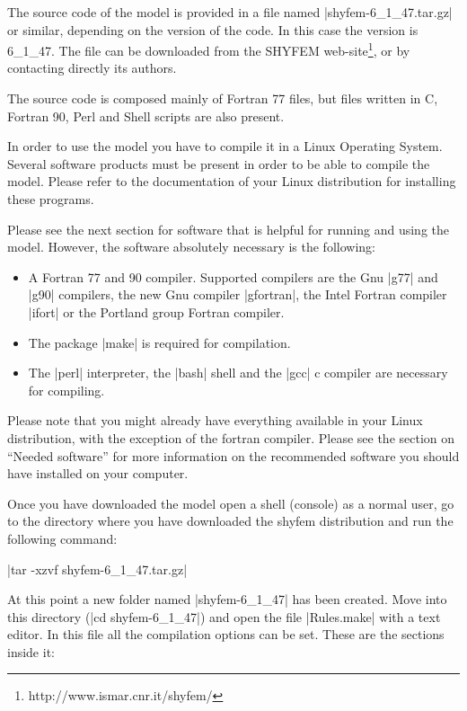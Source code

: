 
\newcommand{\version}{6_1_47}
\newcommand{\shydir}{shyfem-\version}

The source code of the model is provided in a file named 
|\shydir.tar.gz| or similar, depending on the version
of the code. In this case the version is \version.
The file can be downloaded from the SHYFEM 
web-site\footnote{http://www.ismar.cnr.it/shyfem/}, or
by contacting directly its authors.

The source code is composed mainly of Fortran 77 files, but
files written in C, Fortran 90, Perl and Shell scripts
are also present.

In order to use the model you have to compile it in a
Linux Operating System. Several software products must be present
in order to be able to compile the model. Please refer to
the documentation of your Linux distribution for installing these programs.

Please see the next section for software that is
helpful for running and using the model.
However, the software absolutely necessary is the following:

\begin{itemize}
\item A Fortran 77 and 90 compiler. Supported compilers are
the Gnu |g77| and |g90| compilers, the new Gnu compiler |gfortran|,
the Intel Fortran compiler |ifort| or the Portland group Fortran compiler.
\item The package |make| is required for compilation.
\item The |perl| interpreter, the |bash| shell and the |gcc| c compiler
are necessary for compiling.
\end{itemize}

Please note that you might already have everything available in your
Linux distribution, with the exception of the fortran compiler.
Please see the section on ``Needed software'' for more information
on the recommended software you should have installed on your computer.

Once you have downloaded the model open a shell (console) as 
a normal user, go to the directory where you have downloaded the
shyfem distribution and run the following command:

\begin{citation}
\item |tar -xzvf \shydir.tar.gz|
\end{citation}

At this point a new folder named |\shydir|
has been created. Move into this directory (|cd \shydir|) 
and open the file
|Rules.make| with a text editor.
In this file all the compilation options can be set.
These are the sections inside it:

